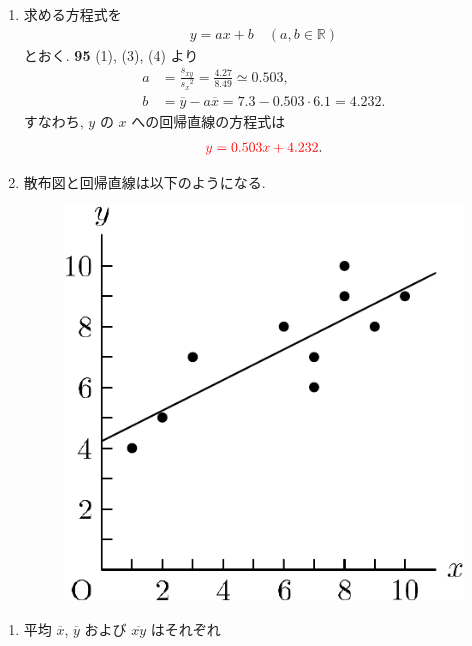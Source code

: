 \begin{qenumerate}
{	}
	\item{
		\begin{enumerate}
		\item{
			求める方程式を
			\begin{align}
				y = ax + b\quad (a, b\in \mathbb{R})
			\end{align}
			とおく.
			{\textbf{95}} (1), (3), (4) より
			\begin{align}
				a &= \frac{s_{xy}}{{s_{x}}^{2}} = \frac{4.27}{8.49} \simeq 0.503, \\
				b &= \overline{y} - a\overline{x} = 7.3 - 0.503\cdot 6.1 = 4.232.
			\end{align}
			すなわち, $y$ の $x$ への回帰直線の方程式は
			\begin{align}
				\textcolor{red}{y = 0.503x + 4.232}.
			\end{align}
		}
		\item{
			散布図と回帰直線は以下のようになる.
			\begin{figure}[H]
				\centering
				\includegraphics[scale = 0.5]{./figure/98.pdf}
			\end{figure}
		}
		\end{enumerate}
	}
	\item{
		\begin{enumerate}
			\item{
				平均 $\overline{x}$, $\overline{y}$ および $\overline{xy}$ はそれぞれ
				\begin{align}

\end{align}}
\end{enumerate}}
\end{qenumerate}
